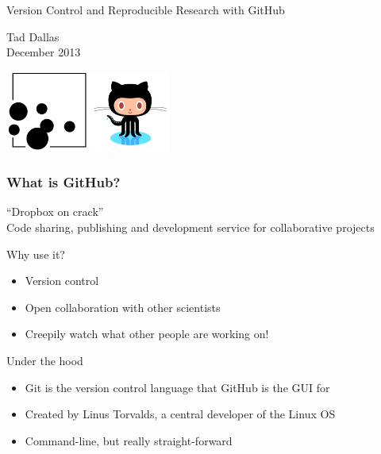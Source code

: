 \documentclass{beamer}\usepackage{graphicx, color}
\begin{document}
\begin{frame}
\LARGE
Version Control and Reproducible Research with GitHub \\
\begin{center}
\vspace{2cm}
Tad Dallas \\
December 2013 \\
\end{center}
\includegraphics[width=0.2\textwidth]{ceesglogo.png}
\hfill \includegraphics[width=0.2\textwidth]{github-logo.png}
\end{frame}



\begin{frame}
 \frametitle{What is GitHub?}
``Dropbox on crack''\\
Code sharing, publishing and development service for collaborative projects

\begin{block}{Why use it?}
 \begin{itemize}
  \item Version control 
  \item Open collaboration with other scientists
  \item Creepily watch what other people are working on!
 \end{itemize}
\end{block}


\begin{block}{Under the hood}
 \begin{itemize}
  \item Git is the version control language that GitHub is the GUI for
  \item Created by Linus Torvalds, a central developer of the Linux OS 
  \item Command-line, but really straight-forward
 \end{itemize}
\end{block}
\end{frame}
\end{document}
